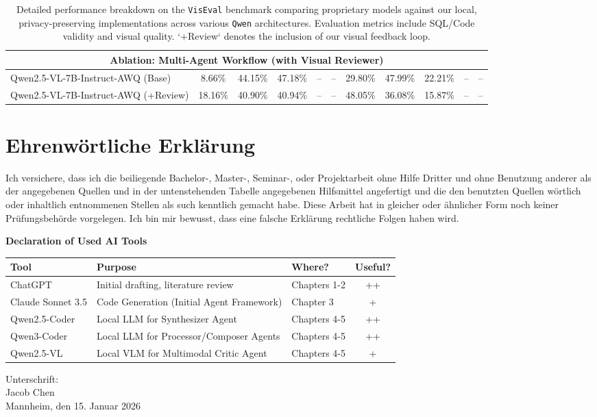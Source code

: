 \documentclass[a4paper,oneside,bibliography=totoc]{scrbook}
\begin{document}
\begin{table}[h!]
{\begin{tabular}{l|ccccc|ccccc}
\midrule
\multicolumn{11}{c}{\textbf{Ablation: Multi-Agent Workflow (with Visual Reviewer)}} \\
\midrule
Qwen2.5-VL-7B-Instruct-AWQ (Base) & 8.66\% & 44.15\% & 47.18\% & -- & -- & 29.80\% & 47.99\% & 22.21\% & -- & -- \\
Qwen2.5-VL-7B-Instruct-AWQ (+Review) & 18.16\% & 40.90\% & 40.94\% & -- & -- & 48.05\% & 36.08\% & 15.87\% & -- & -- \\

\bottomrule
\end{tabular}
}
\caption{Detailed performance breakdown on the \texttt{VisEval} benchmark comparing proprietary models against our local, privacy-preserving implementations across various \texttt{Qwen} architectures. Evaluation metrics include SQL/Code validity and visual quality. `+Review` denotes the inclusion of our visual feedback loop.}
\label{tab:detailed_viseval_results}
\end{table}

\chapter{Ehrenwörtliche Erklärung}

Ich versichere, dass ich die beiliegende Bachelor-, Master-, Seminar-, oder
Projektarbeit ohne Hilfe Dritter und ohne Benutzung anderer als der angegebenen
Quellen und in der untenstehenden Tabelle angegebenen Hilfsmittel angefertigt
und die den benutzten Quellen wörtlich oder inhaltlich entnommenen Stellen als
such kenntlich gemacht habe. Diese Arbeit hat in gleicher oder ähnlicher Form
noch keiner Prüfungsbehörde vorgelegen. Ich bin mir bewusst, dass eine falsche
Erklärung rechtliche Folgen haben wird.

\begin{center}
 \textbf{Declaration of Used AI Tools} \\[.3em]
 \begin{tabularx}{\textwidth}{lXlc}
 \toprule
 Tool & Purpose & Where? & Useful? \\
 \midrule
 ChatGPT & Initial drafting, literature review & Chapters 1-2 & ++ \\
 Claude Sonnet 3.5 & Code Generation (Initial Agent Framework) & Chapter 3 & + \\
 Qwen2.5-Coder & Local LLM for Synthesizer Agent & Chapters 4-5 & ++ \\
 Qwen3-Coder & Local LLM for Processor/Composer Agents & Chapters 4-5 & ++ \\
 Qwen2.5-VL & Local VLM for Multimodal Critic Agent & Chapters 4-5 & + \\
 \bottomrule
 \end{tabularx}
\end{center}

\vspace{2cm}
\noindent Unterschrift:\\
\noindent Jacob Chen\\
\noindent Mannheim, den 15. Januar 2026 \hfill
\end{document}
